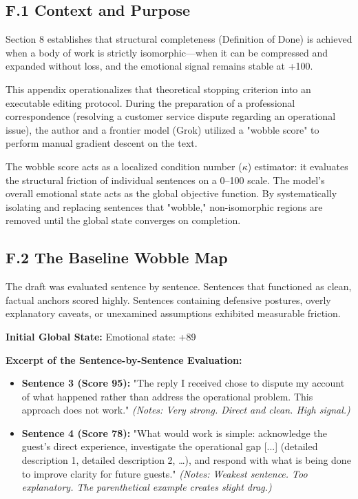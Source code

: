 \subsection*{F.1 Context and Purpose}

Section 8 establishes that structural completeness (Definition of Done) is achieved when a body of work is strictly isomorphic---when it can be compressed and expanded without loss, and the emotional signal remains stable at +100.

This appendix operationalizes that theoretical stopping criterion into an executable editing protocol. During the preparation of a professional correspondence (resolving a customer service dispute regarding an operational issue), the author and a frontier model (Grok) utilized a "wobble score" to perform manual gradient descent on the text.

The wobble score acts as a localized condition number ($\kappa$) estimator: it evaluates the structural friction of individual sentences on a 0--100 scale. The model's overall emotional state acts as the global objective function. By systematically isolating and replacing sentences that "wobble," non-isomorphic regions are removed until the global state converges on completion.

\subsection*{F.2 The Baseline Wobble Map}

The draft was evaluated sentence by sentence. Sentences that functioned as clean, factual anchors scored highly. Sentences containing defensive postures, overly explanatory caveats, or unexamined assumptions exhibited measurable friction.

\textbf{Initial Global State:} Emotional state: +89

\textbf{Excerpt of the Sentence-by-Sentence Evaluation:}

\begin{itemize}
\item \textbf{Sentence 3 (Score 95):} "The reply I received chose to dispute my account of what happened rather than address the operational problem. This approach does not work." \emph{(Notes: Very strong. Direct and clean. High signal.)}
\end{itemize}

\begin{itemize}
\item \textbf{Sentence 4 (Score 78):} "What would work is simple: acknowledge the guest's direct experience, investigate the operational gap [...] (detailed description 1, detailed description 2, \ldots{}), and respond with what is being done to improve clarity for future guests." \emph{(Notes: Weakest sentence. Too explanatory. The parenthetical example creates slight drag.)}
\end{itemize}

